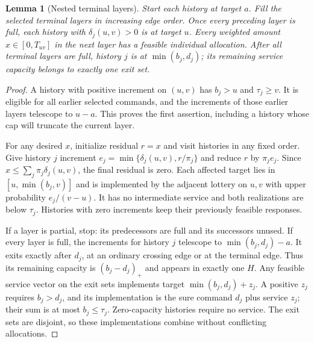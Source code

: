\documentclass[11pt,letterpaper]{article}
\newtheorem{lemma}[theorem]{Lemma}
\theoremstyle{definition}\newtheorem{remark}[theorem]{Remark}
\begin{document}
\begin{lemma}[Nested terminal layers]\label{lem:nested54}
Start each history at target $a$. Fill the selected terminal layers in increasing edge order. Once every preceding layer is full, each history with $\delta_j(u,v)>0$ is at target $u$. Every weighted amount $x\in[0,T_{uv}]$ in the next layer has a feasible individual allocation. After all terminal layers are full, history $j$ is at $\min(b_j,d_j)$; its remaining service capacity belongs to exactly one exit set.
\end{lemma}
\begin{proof}
A history with positive increment on $(u,v)$ has $b_j>u$ and $\tau_j\geq v$. It is eligible for all earlier selected commands, and the increments of those earlier layers telescope to $u-a$. This proves the first assertion, including a history whose cap will truncate the current layer.

For any desired $x$, initialize residual $r=x$ and visit histories in any fixed order. Give history $j$ increment $e_j=\min\{\delta_j(u,v),r/\pi_j\}$ and reduce $r$ by $\pi_je_j$. Since $x\leq\sum_j\pi_j\delta_j(u,v)$, the final residual is zero. Each affected target lies in $[u,\min(b_j,v)]$ and is implemented by the adjacent lottery on $u,v$ with upper probability $e_j/(v-u)$. It has no intermediate service and both realizations are below $\tau_j$. Histories with zero increments keep their previously feasible responses.

If a layer is partial, stop: its predecessors are full and its successors unused. If every layer is full, the increments for history $j$ telescope to $\min(b_j,d_j)-a$. It exits exactly after $d_j$, at an ordinary crossing edge or at the terminal edge. Thus its remaining capacity is $(b_j-d_j)_+$ and appears in exactly one $H$. Any feasible service vector on the exit sets implements target $\min(b_j,d_j)+z_j$. A positive $z_j$ requires $b_j>d_j$, and its implementation is the sure command $d_j$ plus service $z_j$; their sum is at most $b_j\leq\tau_j$. Zero-capacity histories require no service. The exit sets are disjoint, so these implementations combine without conflicting allocations.
\end{proof}
\end{document}
